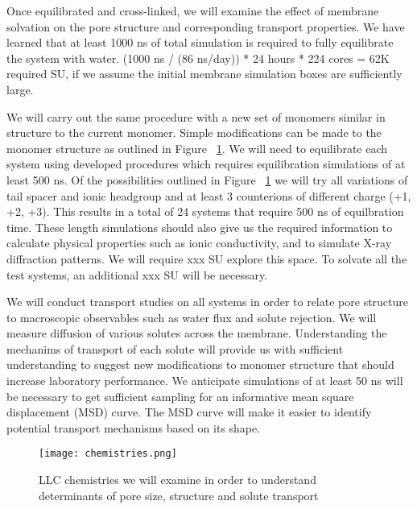 Once equilibrated and cross-linked, we will examine the effect of membrane
solvation on the pore structure and corresponding transport properties.
We have learned that at least 1000 ns of total simulation is required
to fully equilibrate the system with water. (1000 ns / (86 ns/day)) * 24
hours * 224 cores = 62K required SU, if we assume the initial
membrane simulation boxes are sufficiently large.

We will carry out the same procedure with a new set of monomers similar
in structure to the current monomer. Simple modifications can be made
to the monomer structure as outlined in Figure ~\ref{fig:chemistries}. 
We will need to equilibrate each system using developed procedures which
requires equilibration simulations of at least 500 ns. Of the 
possibilities outlined in Figure ~\ref{fig:chemistries} we will try all
variations of tail spacer and ionic headgroup and at least 3 counterions
of different charge (+1, +2, +3). This results in a total of 24 systems 
that require 500 ns of equilbration time. These length simulations should
also give us the required information to calculate physical properties 
such as ionic conductivity, and to simulate X-ray diffraction patterns.
We will require xxx SU explore this space. To solvate all the test
systems, an additional xxx SU will be necessary.

We will conduct transport studies on all systems in order to relate pore
structure to macroscopic observables such as water flux and solute
rejection. We will measure diffusion of various solutes across the 
membrane. Understanding the mechanims of transport of each solute will
provide us with sufficient understanding to suggest new modifications 
to monomer structure that should increase laboratory performance. We
anticipate simulations of at least 50 ns will be necessary to get 
sufficient sampling for an informative mean square displacement (MSD) 
curve. The MSD curve will make it easier to identify potential 
transport mechanisms based on its shape.

\begin{figure}
\centering
\texttt{[image: chemistries.png]}  %
	\caption{LLC chemistries we will examine in order to understand determinants of pore size, structure and solute transport}
	\label{fig:chemistries}
\end{figure}

